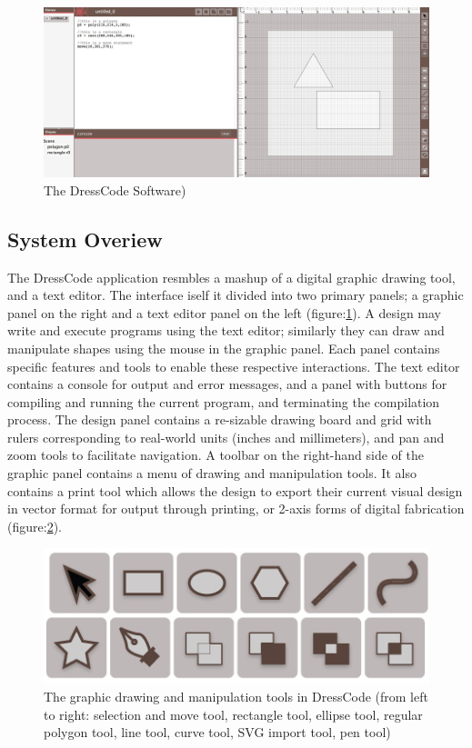 \documentclass{sigchi}
\begin{document}
\begin{figure}
\includegraphics[width=\textwidth]{images/application_image_sm_content.jpg}
\caption{The DressCode Software)}
\label{fig:application_image}
\end{figure}

\subsection{System Overiew}
The DressCode application resmbles a mashup of a digital graphic drawing tool, and a text editor. The interface iself it divided into two primary panels; a graphic panel on the right and a text editor panel on the left (figure:\ref{fig:application_image}). A design may write and execute programs using the text editor; similarly they can draw and manipulate shapes using the mouse in the graphic panel. Each panel contains specific features and tools to enable these respective interactions. The text editor contains a console for output and error messages, and a panel with buttons for compiling and running the current program, and terminating the compilation process. The design panel contains a re-sizable drawing board and grid with rulers corresponding to real-world units (inches and millimeters), and pan and zoom tools to facilitate navigation. A toolbar on the right-hand side of the graphic panel contains a menu of drawing and manipulation tools. It also contains a print tool which allows the design to export their current visual design in vector format for output through printing, or 2-axis forms of digital fabrication (figure:\ref{fig:graphic_tools}).

\begin{center}
\begin{figure}[h!]
\includegraphics[width=\columnwidth]{images/graphic_tools.jpg}
\caption{The graphic drawing and manipulation tools in DressCode (from left to right: selection and move tool, rectangle tool, ellipse tool, regular polygon tool, line tool, curve tool, SVG import tool, pen tool)}
\label{fig:graphic_tools}
\end{figure}
\end{center}
\vspace{-20pt}
\end{document}

